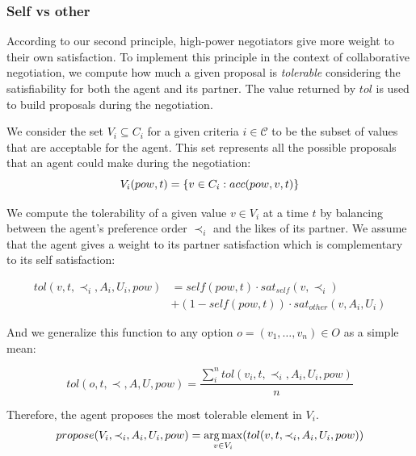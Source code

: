 \documentclass{llncs}
\begin{document}
		
		\subsubsection {Self vs other}
		According to our second principle, high-power negotiators give more weight to their own satisfaction. To implement this principle in the context of collaborative negotiation, we compute how much a given proposal is \emph{tolerable} considering the satisfiability for both the agent and its partner. The value returned by $tol$ is used to build proposals during the negotiation. 
		
		We consider the set $V_i\subseteq C_i$ for a given criteria $i\in\mathcal{C}$ to  be the subset of values that are acceptable for the agent. This set represents all the possible proposals that an agent could make during the negotiation:
		\vspace{-0.5em} 
		\begin{equation}
		V_i(pow,t) = \{ v\in C_i : acc(pow,v,t) \}
		\vspace{-0.5em} 
		\end{equation}
		
		We compute the tolerability of a given value $v\in V_i$ at a time $t$ by balancing between the agent's preference order $\prec_i$ and the likes of its partner. We assume that the agent gives a weight to its partner satisfaction which is complementary to its self satisfaction:
		
		\vspace{-0.5em} 
		\begin{equation}
		\begin{split}
		tol(v, t, \prec_i, A_i, U_i, pow) & = self(pow, t)  \cdot sat_{self}(v, \prec_i) \\
		& +  (1 - self(pow, t)) \cdot sat_{other}(v, A_i, U_i)
		\end{split} 
		\end{equation}
		
		And we generalize this function to any option $o=(v_1,\ldots,v_n) \in O$ as a simple mean:
		
		\begin{equation}
		tol(o, t, \prec, A, U, pow) = \frac{ \sum_{i}^{n} tol(v_i, t, \prec_i, A_i, U_i, pow) } {n}
		\end{equation}
		
		Therefore, the agent proposes the most tolerable element in $V_i$.
				\vspace{-0.5em} 
		\begin{equation}
			propose(V_i, \prec_i, A_i, U_i, pow) =  \operatorname*{arg\,max}_{v \in V_i} ( tol(v, t, \prec_i, A_i, U_i, pow))
							\vspace{-1.5em} 
		\end{equation}
\end{document}
